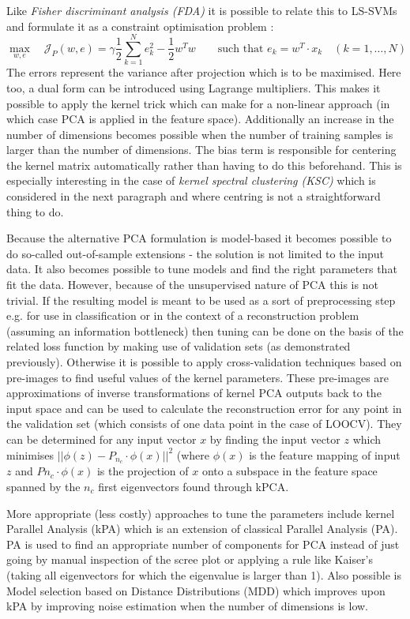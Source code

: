 \par Like \textit{Fisher discriminant analysis (FDA)} it is possible to relate this to LS-SVMs and formulate it as a constraint optimisation problem :
$$\max_{w,e}\quad\mathcal{J}_P(w,e)=\gamma\frac{1}{2}\sum_{k=1}^Ne_k^2-\frac{1}{2}w^Tw\qquad\text{such that $e_k=w^T\cdot x_k\quad(k=1,\dots, N)$}$$
The errors represent the variance after projection which is to be maximised. Here too, a dual form can be introduced using Lagrange multipliers. This makes it possible to apply the kernel trick which can make for a non-linear approach (in which case PCA is applied in the feature space). Additionally an increase in the number of dimensions becomes possible when the number of training samples is larger than the number of dimensions. The bias term is responsible for centering the kernel matrix automatically rather than having to do this beforehand. This is especially interesting in the case of \textit{kernel spectral clustering (KSC)} which is considered in the next paragraph and where centring is not a straightforward thing to do.

\par Because the alternative PCA formulation is model-based it becomes possible to do so-called out-of-sample extensions - the solution is not limited to the input data. It also becomes possible to tune models and find the right parameters that fit the data. However, because of the unsupervised nature of PCA this is not trivial. If the resulting model is meant to be used as a sort of preprocessing step e.g. for use in classification or in the context of a reconstruction problem (assuming an information bottleneck) then tuning can be done on the basis of the related loss function by making use of validation sets (as demonstrated previously). Otherwise it is possible to apply cross-validation techniques based on pre-images to find useful values of the kernel parameters. These pre-images are approximations of inverse transformations of kernel PCA outputs back to the input space and can be used to calculate the reconstruction error for any point in the validation set (which consists of one data point in the case of LOOCV). They can be determined for any input vector $x$ by finding the input vector $z$ which minimises $||\phi(z)-P_{n_c}\cdot \phi(x)||^2$ (where $\phi(x)$ is the feature mapping of input $z$ and $P{n_c}\cdot\phi(x)$ is the projection of $x$ onto a subspace in the feature space spanned by the $n_c$ first eigenvectors found through kPCA.

\par More appropriate (less costly) approaches to tune the parameters include kernel Parallel Analysis (kPA) which is an extension of classical Parallel Analysis (PA). PA is used to find an appropriate number of components for PCA instead of just going by manual inspection of the scree plot or applying a rule like Kaiser's (taking all eigenvectors for which the eigenvalue is larger than 1). Also possible is Model selection based on Distance Distributions (MDD) which improves upon kPA by improving noise estimation when the number of dimensions is low.

